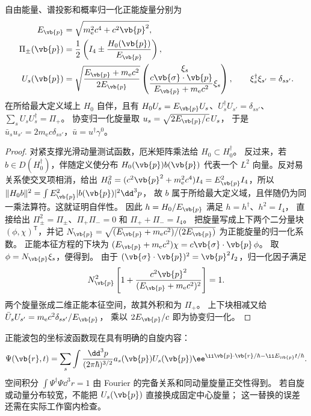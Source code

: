 \begin{proposition}[正能旋量与概率投影]
自由能量、谱投影和概率归一化正能旋量分别为
\begin{align}
E_{\vb{p}}&=\sqrt{m_{\mathrm e}^2c^4+c^2\vb{p}^2},
\label{eq:feqo-primer-dispersion}\\
\Pi_\pm(\vb{p})&=\frac12\left(I_4\pm\frac{H_0(\vb{p})}{E_{\vb{p}}}\right),
\label{eq:feqo-primer-energy-projectors}\\
U_s(\vb{p})&=\sqrt{\frac{E_{\vb{p}}+m_{\mathrm e}c^2}{2E_{\vb{p}}}}
\begin{pmatrix}\xi_s\\
\displaystyle\frac{c\vb{\sigma}\cdot\vb{p}}{E_{\vb{p}}+m_{\mathrm e}c^2}\xi_s
\end{pmatrix},\qquad \xi_s^\dagger\xi_{s'}=\delta_{ss'}.
\label{eq:feqo-primer-spinor}
\end{align}
在所给最大定义域上 $H_0$ 自伴，且有 $H_0U_s=E_{\vb{p}}U_s$、$U_s^\dagger U_{s'}=\delta_{ss'}$、
$\sum_sU_sU_s^\dagger=\Pi_+$。
协变归一化旋量取 $u_s=\sqrt{2E_{\vb{p}}/c}\,U_s$，
于是 $\bar u_su_{s'}=2m_{\mathrm e}c\delta_{ss'}$，$\bar u=u^\dagger\gamma^0$。
\end{proposition}
\begin{proof}
对紧支撑光滑动量测试函数，厄米矩阵乘法给 $H_0\subset H_0^\dagger$。
反过来，若 $b\in D(H_0^\dagger)$，伴随定义使分布 $H_0(\vb{p})b(\vb{p})$
代表一个 $L^2$ 向量。反对易关系使交叉项相消，给出
$H_0^2=(c^2\vb{p}^2+m_{\mathrm e}^2c^4)I_4=E_{\vb{p}}^2I_4$，所以
$\|H_0b\|^2=\int E_{\vb{p}}^2|b(\vb{p})|^2\dd^3p$，
故 $b$ 属于所给最大定义域，且伴随仍为同一乘法算符。这就证明自伴性。
因此 $h=H_0/E_{\vb{p}}$ 满足 $h=h^\dagger$、$h^2=I_4$，
直接给出 $\Pi_\pm^2=\Pi_\pm$、$\Pi_+\Pi_-=0$ 和 $\Pi_++\Pi_-=I_4$。
把旋量写成上下两个二分量块 $(\phi,\chi)^{\mathsf T}$，并记
$N_{\vb{p}}=\sqrt{(E_{\vb{p}}+m_{\mathrm e}c^2)/(2E_{\vb{p}})}$ 为正能旋量的归一化系数。
正能本征方程的下块为
$(E_{\vb{p}}+m_{\mathrm e}c^2)\chi=c\vb{\sigma}\cdot\vb{p}\,\phi$。
取 $\phi=N_{\vb{p}}\xi_s$，便得到。
由于 $(\vb{\sigma}\cdot\vb{p})^2=\vb{p}^2I_2$，归一化因子满足
\[
N_{\vb{p}}^2\left[1+\frac{c^2\vb{p}^2}{(E_{\vb{p}}+m_{\mathrm e}c^2)^2}\right]=1.
\]
两个旋量张成二维正能本征空间，故其外积和为 $\Pi_+$。
上下块相减又给 $\bar U_sU_{s'}=m_{\mathrm e}c^2\delta_{ss'}/E_{\vb{p}}$，
乘以 $2E_{\vb{p}}/c$ 即为协变归一化。
\end{proof}

正能波包的坐标波函数现在具有明确的自旋内容：
\[
\Psi(\vb{r},t)=\sum_s\int\frac{\dd^3p}{(2\pi\hbar)^{3/2}}
a_s(\vb{p})U_s(\vb{p})
\ee^{\ii\vb{p}\cdot\vb{r}/\hbar-\ii E_{\vb{p}}t/\hbar}.
\]
空间积分 $\int\Psi^\dagger\Psi\dd^3r=1$ 由 Fourier 的完备关系和同动量旋量正交性得到。
若自旋或动量分布较宽，不能把 $U_s(\vb{p})$ 直接换成固定中心旋量；
这一替换的误差还需在实际工作窗内检查。

